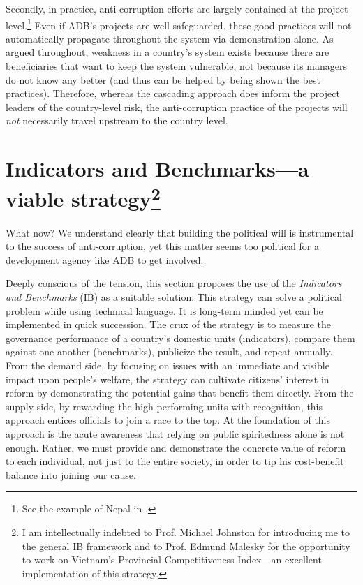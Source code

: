 \documentclass[12pt]{article}
\begin{document}
Secondly, in practice, anti-corruption efforts are largely contained at the project level.\footnote{See the example of Nepal in \citet[15]{ADB2013}.} Even if ADB's projects are well safeguarded, these good practices will not automatically propagate throughout the system via demonstration alone. As argued throughout, weakness in a country's system exists because there are beneficiaries that want to keep the system vulnerable, not because its managers do not know any better (and thus can be helped by being shown the best practices). Therefore, whereas the cascading approach does inform the project leaders of the country-level risk, the anti-corruption practice of the projects will \textit{not} necessarily travel upstream to the country level.

\section[Indicators and Benchmarks---a viable strategy]{Indicators and Benchmarks---a viable strategy\footnote{I am intellectually indebted to Prof. Michael Johnston for introducing me to the general IB framework and to Prof. Edmund Malesky for the opportunity to work on Vietnam's Provincial Competitiveness Index---an excellent implementation of this strategy.}}
\label{sec:IB}

What now? We understand clearly that building the political will is instrumental to the success of anti-corruption, yet this matter seems too political for a development agency like ADB to get involved.

Deeply conscious of the tension, this section proposes the use of the \textit{Indicators and Benchmarks} (IB) as a suitable solution. This strategy can solve a political problem while using technical language. It is long-term minded yet can be implemented in quick succession. The crux of the strategy is to measure the governance performance of a country's domestic units (indicators), compare them against one another (benchmarks), publicize the result, and repeat annually. From the demand side, by focusing on issues with an immediate and visible impact upon people's welfare, the strategy can cultivate citizens' interest in reform by demonstrating the potential gains that benefit them directly. From the supply side, by rewarding the high-performing units with recognition, this approach entices officials to join a race to the top. At the foundation of this approach is the acute awareness that relying on public spiritedness alone is not enough. Rather, we must provide and demonstrate the concrete value of reform to each individual, not just to the entire society, in order to tip his cost-benefit balance into joining our cause.
\end{document}
